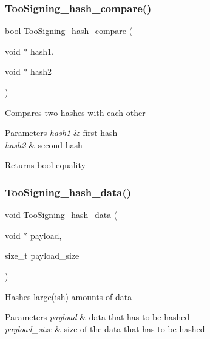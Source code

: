 \subsubsection{\texorpdfstring{Too\+Signing\+\_\+hash\+\_\+compare()}{TooSigning\_hash\_compare()}}
{\footnotesize\ttfamily bool Too\+Signing\+\_\+hash\+\_\+compare (\begin{DoxyParamCaption}\item[{void $\ast$}]{hash1,  }\item[{void $\ast$}]{hash2 }\end{DoxyParamCaption})}

Compares two hashes with each other


\begin{DoxyParams}{Parameters}
{\em hash1} & first hash \\
\hline
{\em hash2} & second hash \\
\hline
\end{DoxyParams}
\begin{DoxyReturn}{Returns}
bool equality 
\end{DoxyReturn}
\mbox{\label{group__TOOSIGNING__HASHING_gafb2935303b05255e80a7a6fa4be7cf57}} 
\subsubsection{\texorpdfstring{Too\+Signing\+\_\+hash\+\_\+data()}{TooSigning\_hash\_data()}}
{\footnotesize\ttfamily void Too\+Signing\+\_\+hash\+\_\+data (\begin{DoxyParamCaption}\item[{void $\ast$}]{payload,  }\item[{size\+\_\+t}]{payload\+\_\+size }\end{DoxyParamCaption})}

Hashes large(ish) amounts of data


\begin{DoxyParams}{Parameters}
{\em payload} & data that has to be hashed \\
\hline
{\em payload\+\_\+size} & size of the data that has to be hashed \\
\hline
\end{DoxyParams}
\mbox{\label{group__TOOSIGNING__HASHING_ga7696a20bc1d03d129afbdc8d6e446aa2}} 
